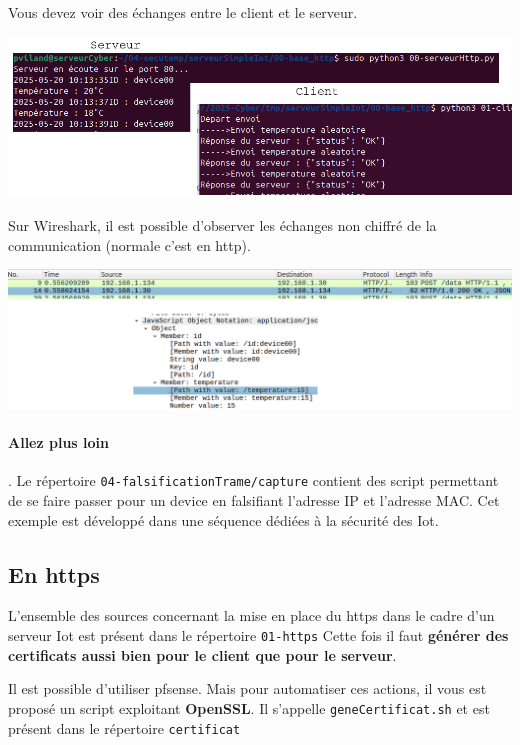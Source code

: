 \documentclass[french, 12pt]{article}%
\begin{document}
Vous devez voir des échanges entre le client et le serveur.
\begin{center}
\includegraphics[scale=0.5]{./ressource/exServeurIotHttp}
\end{center}

Sur Wireshark, il est possible d'observer les échanges non chiffré de la communication (normale c'est en http). 
\begin{center}
\includegraphics[scale=0.4]{./ressource/resWireshark}
\end{center}

\paragraph{Allez plus loin}. Le répertoire \verb?04-falsificationTrame/capture? contient des script permettant de se faire passer pour un device en falsifiant l'adresse IP et l'adresse MAC. Cet exemple est développé dans une séquence dédiées à la sécurité des Iot.

\subsection{En https}

L'ensemble des sources concernant la mise en place du https dans le cadre d'un serveur Iot est présent dans le répertoire \verb?01-https? Cette fois il faut \textbf{générer des certificats aussi bien pour le client que pour le serveur}.

\vspace{0.5cm}
Il est possible d'utiliser pfsense. Mais pour automatiser ces actions, il vous est proposé un script exploitant  \textbf{OpenSSL}. Il s'appelle \verb?geneCertificat.sh? et est présent dans le répertoire \verb?certificat?
\end{document}
